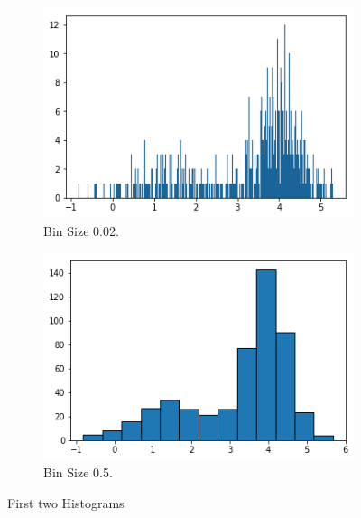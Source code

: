 \begin{questions}
\begin{figure}[H]
	\centering
	\begin{subfigure}[b]{0.4\linewidth}
		\includegraphics[width=\linewidth]{pictures/histogram002.png}
		\caption{Bin Size 0.02.}
		\label{fig:histogram1}
	\end{subfigure}
	\begin{subfigure}[b]{0.4\linewidth}
		\includegraphics[width=\linewidth]{pictures/histogram05.png}
		\caption{Bin Size 0.5.}
		\label{fig:histogram2}
	\end{subfigure}
	\caption{First two Histograms}
\end{figure}


\end{questions}
